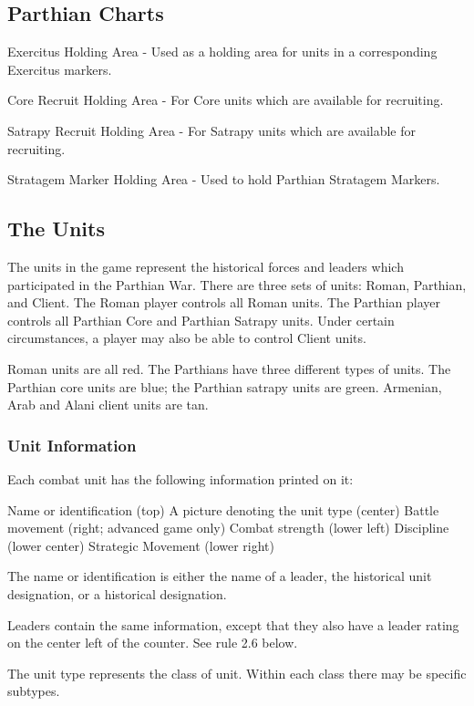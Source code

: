 \subsection{Parthian Charts}

Exercitus Holding Area - Used as a holding area for units in a corresponding Exercitus markers.

Core Recruit Holding Area - For Core units which are available for recruiting.

Satrapy Recruit Holding Area - For Satrapy units which are available for recruiting.

Stratagem Marker Holding Area - Used to hold Parthian Stratagem Markers.

\subsection{The Units}

The units in the game represent the historical forces and leaders which participated in the Parthian War. There are three sets of units: Roman, Parthian, and Client. The Roman player controls all Roman units. The Parthian player controls all Parthian Core and Parthian Satrapy units. Under certain circumstances, a player may also be able to control Client units.

Roman units are all red. The Parthians have three different types of units. The Parthian core units are blue; the Parthian satrapy units are green. Armenian, Arab and Alani client units are tan.

\subsubsection{Unit Information}

Each combat unit has the following information printed on it:

Name or identification (top)
A picture denoting the unit type (center)
Battle movement (right; advanced game only)
Combat strength (lower left)
Discipline (lower center)
Strategic Movement (lower right)

The name or identification is either the name of a leader, the historical unit designation, or a historical designation.

Leaders contain the same information, except that they also have a leader rating on the center left of the counter. See rule 2.6 below.

The unit type represents the class of unit. Within each class there may be specific subtypes.


